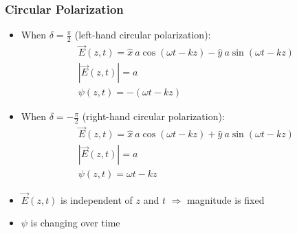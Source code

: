 \documentclass[a4paper]{article}
\begin{document}
\subsubsection{Circular Polarization}
\begin{itemize}
    \item When $\delta = \displaystyle\frac{\pi}{2}$ (left-hand circular polarization):
    $$\begin{array}{c}
         \overrightarrow{E}(z, t) = \hat{x}\ a\cos(\omega t-kz)-\hat{y}\ a \sin(\omega t-kz)\\
         |\overrightarrow{E}(z, t)| = a\\
         \psi(z, t) = -(\omega t-kz)
    \end{array}$$
    \item When $\delta = \displaystyle-\frac{\pi}{2}$ (right-hand circular polarization):
    $$\begin{array}{c}
         \overrightarrow{E}(z, t) = \hat{x}\ a\cos(\omega t-kz)+\hat{y}\ a \sin(\omega t-kz)\\
         |\overrightarrow{E}(z, t)| = a\\
         \psi(z, t) = \omega t-kz
    \end{array}$$
    \item $\overrightarrow{E}(z, t)$ is independent of $z$ and $t$ $\Rightarrow$ magnitude is fixed
    \item $\psi$ is changing over time
\end{itemize}

\newpage
\end{document}
